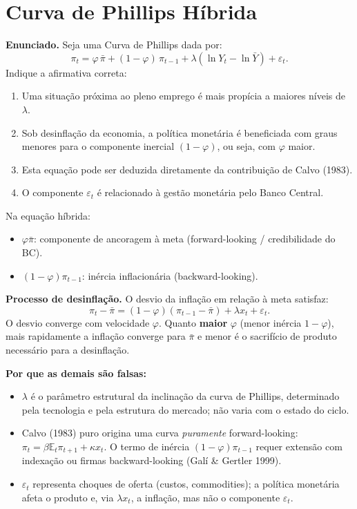 \documentclass[12pt, a4paper]{article}
\newcommand{\E}{\mathbb{E}}
\begin{document}
\section{Curva de Phillips Híbrida}

\textbf{Enunciado.} Seja uma Curva de Phillips dada por:
\[
\pi_t = \varphi\,\bar{\pi} + (1-\varphi)\,\pi_{t-1}
  + \lambda(\ln Y_t - \ln\bar{Y}) + \varepsilon_t.
\]
Indique a afirmativa correta:

\begin{enumerate}[label=\alph*)]
\item Uma situação próxima ao pleno emprego é mais propícia a maiores níveis de $\lambda$.
\item Sob desinflação da economia, a política monetária é beneficiada com graus menores para o componente inercial $(1-\varphi)$, ou seja, com $\varphi$ maior.
\item Esta equação pode ser deduzida diretamente da contribuição de Calvo (1983).
\item O componente $\varepsilon_t$ é relacionado à gestão monetária pelo Banco Central.
\end{enumerate}

\begin{correctbox}[title={Resposta correta: b)}]
Na equação híbrida:
\begin{itemize}[leftmargin=*]
\item $\varphi\bar{\pi}$: componente de ancoragem à meta (forward-looking / credibilidade do BC).
\item $(1-\varphi)\pi_{t-1}$: inércia inflacionária (backward-looking).
\end{itemize}

\textbf{Processo de desinflação.} O desvio da inflação em relação à meta satisfaz:
\[
\pi_t - \bar{\pi} = (1-\varphi)(\pi_{t-1} - \bar{\pi}) + \lambda x_t + \varepsilon_t.
\]
O desvio converge com velocidade $\varphi$. Quanto \textbf{maior} $\varphi$ (menor inércia
$1-\varphi$), mais rapidamente a inflação converge para $\bar{\pi}$ e menor é o sacrifício de
produto necessário para a desinflação. \checkmark

\textbf{Por que as demais são falsas:}
\begin{itemize}[leftmargin=*]
\item[a)] $\lambda$ é o parâmetro estrutural da inclinação da curva de Phillips, determinado pela
tecnologia e pela estrutura do mercado; não varia com o estado do ciclo.
\item[c)] Calvo (1983) puro origina uma curva \emph{puramente} forward-looking:
$\pi_t = \beta\E_t\pi_{t+1} + \kappa x_t$.
O termo de inércia $(1-\varphi)\pi_{t-1}$ requer extensão com indexação ou firmas
backward-looking (Galí \& Gertler 1999).
\item[d)] $\varepsilon_t$ representa choques de oferta (custos, commodities); a política monetária
afeta o produto e, via $\lambda x_t$, a inflação, mas não o componente $\varepsilon_t$.
\end{itemize}
\end{correctbox}
\end{document}
